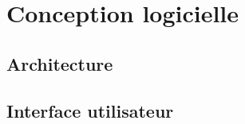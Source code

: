 \chapter{Conception logicielle \label{chap:conception}}
\section{Architecture}
\section{Interface utilisateur}
